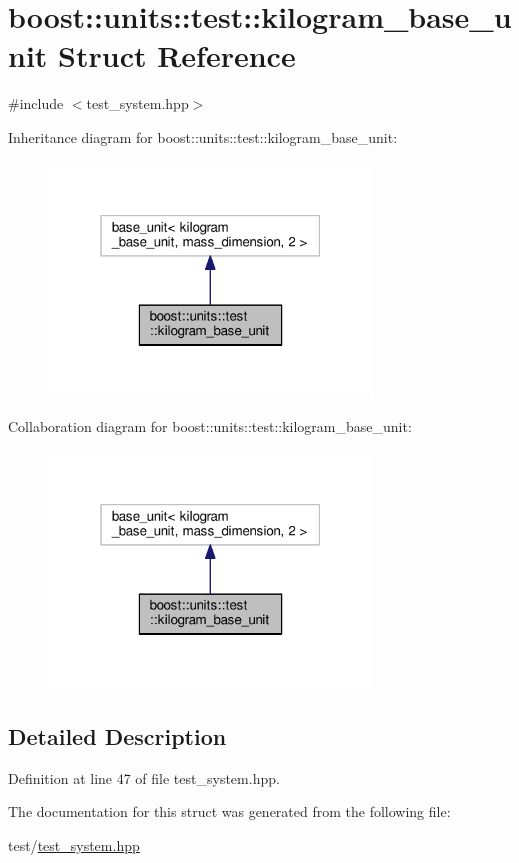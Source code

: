 \hypertarget{structboost_1_1units_1_1test_1_1kilogram__base__unit}{}\section{boost\+:\+:units\+:\+:test\+:\+:kilogram\+\_\+base\+\_\+unit Struct Reference}
\label{structboost_1_1units_1_1test_1_1kilogram__base__unit}


{\ttfamily \#include $<$test\+\_\+system.\+hpp$>$}



Inheritance diagram for boost\+:\+:units\+:\+:test\+:\+:kilogram\+\_\+base\+\_\+unit\+:\nopagebreak
\begin{figure}[H]
\begin{center}
\leavevmode
\includegraphics[width=244pt]{structboost_1_1units_1_1test_1_1kilogram__base__unit__inherit__graph}
\end{center}
\end{figure}


Collaboration diagram for boost\+:\+:units\+:\+:test\+:\+:kilogram\+\_\+base\+\_\+unit\+:\nopagebreak
\begin{figure}[H]
\begin{center}
\leavevmode
\includegraphics[width=244pt]{structboost_1_1units_1_1test_1_1kilogram__base__unit__coll__graph}
\end{center}
\end{figure}


\subsection{Detailed Description}


Definition at line 47 of file test\+\_\+system.\+hpp.



The documentation for this struct was generated from the following file\+:\begin{DoxyCompactItemize}
\item 
test/\hyperlink{test__system_8hpp}{test\+\_\+system.\+hpp}\end{DoxyCompactItemize}
